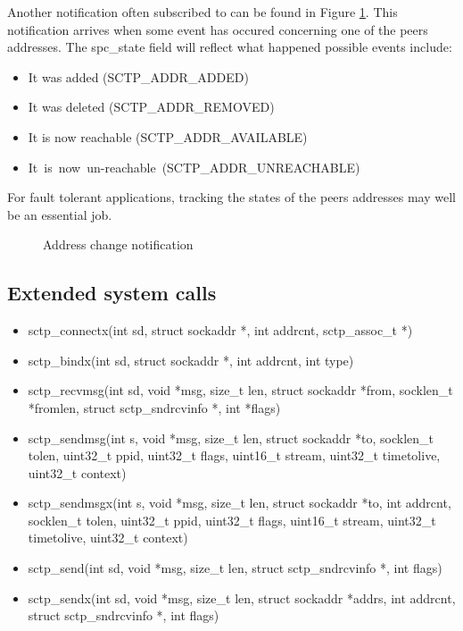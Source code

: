 \documentclass[conference]{IEEEtran}
\begin{document}
Another notification often subscribed to can be found in Figure \ref{fig:paddr}. This notification
arrives when some event has occured concerning one of the peers addresses. The spc\_state
field will reflect what happened possible events include:

\begin{itemize}
 \item  It was added (SCTP\_ADDR\_ADDED)
 \item  It was deleted (SCTP\_ADDR\_REMOVED)
 \item  It is now reachable (SCTP\_ADDR\_AVAILABLE)
 \item  It~is~now~un-reachable~(SCTP\_ADDR\_UNREACHABLE)
\end{itemize}

For fault tolerant applications, tracking the states of the peers addresses
may well be an essential job.

\begin{figure}

\caption{Address change notification}
\label{fig:paddr}
\end{figure}

\subsection{Extended system calls}

\begin{itemize}
 \item  sctp\_connectx(int sd, struct sockaddr *, int addrcnt, sctp\_assoc\_t *)
 \item  sctp\_bindx(int sd, struct sockaddr *, int addrcnt, int type)
 \item  sctp\_recvmsg(int sd, void *msg, size\_t len, struct sockaddr *from, socklen\_t *fromlen, struct sctp\_sndrcvinfo *, int *flags)
 \item  sctp\_sendmsg(int s, void *msg, size\_t len, struct sockaddr *to, socklen\_t tolen, uint32\_t ppid, uint32\_t flags, uint16\_t stream, uint32\_t timetolive, uint32\_t context) \item  sctp\_sendmsgx(int s, void *msg, size\_t len, struct sockaddr *to, int addrcnt, socklen\_t tolen, uint32\_t ppid, uint32\_t flags, uint16\_t stream, uint32\_t timetolive, uint32\_t context)
 \item  sctp\_send(int sd, void *msg, size\_t len, struct sctp\_sndrcvinfo *, int flags)
 \item  sctp\_sendx(int sd, void *msg, size\_t len, struct sockaddr *addrs, int addrcnt, struct sctp\_sndrcvinfo *, int flags)
\end{itemize}
\end{document}
